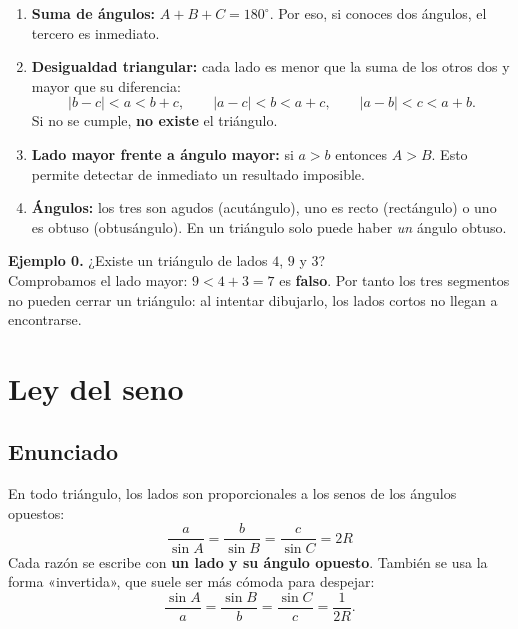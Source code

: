 \documentclass[12pt, letterpaper]{article}
\providecommand{\sen}{\sin}
\begin{document}
\begin{cuadroteoria}
  \small
  \begin{enumerate}[leftmargin=1.4em, nosep]
    \item \textbf{Suma de ángulos:} $A+B+C=180^{\circ}$. Por eso, si conoces
          dos ángulos, el tercero es inmediato.
    \item \textbf{Desigualdad triangular:} cada lado es menor que la suma de
          los otros dos y mayor que su diferencia:
          \[
            |b-c|<a<b+c,\qquad |a-c|<b<a+c,\qquad |a-b|<c<a+b.
          \]
          Si no se cumple, \textbf{no existe} el triángulo.
    \item \textbf{Lado mayor frente a ángulo mayor:} si $a>b$ entonces
          $A>B$. Esto permite detectar de inmediato un resultado imposible.
    \item \textbf{Ángulos:} los tres son agudos (acutángulo), uno es recto
          (rectángulo) o uno es obtuso (obtusángulo). En un triángulo solo
          puede haber \emph{un} ángulo obtuso.
  \end{enumerate}
\end{cuadroteoria}

\begin{cuadrosolucion}
  \small
  \textbf{Ejemplo 0.} ¿Existe un triángulo de lados $4$, $9$ y $3$?\\[2pt]
  Comprobamos el lado mayor: $9<4+3=7$ es \textbf{falso}. Por tanto los tres
  segmentos no pueden cerrar un triángulo: al intentar dibujarlo, los lados
  cortos no llegan a encontrarse.
\end{cuadrosolucion}

\section{Ley del seno}

\subsection*{Enunciado}

\begin{cuadroteoria}
  \small
  En todo triángulo, los lados son proporcionales a los senos de los ángulos
  opuestos:
  \[
    \boxed{\;\frac{a}{\sen A}=\frac{b}{\sen B}=\frac{c}{\sen C}=2R\;}
  \]
  Cada razón se escribe con \textbf{un lado y su ángulo opuesto}. También se
  usa la forma «invertida», que suele ser más cómoda para despejar:
  \[
    \frac{\sen A}{a}=\frac{\sen B}{b}=\frac{\sen C}{c}=\frac{1}{2R}.
  \]
\end{cuadroteoria}
\end{document}
